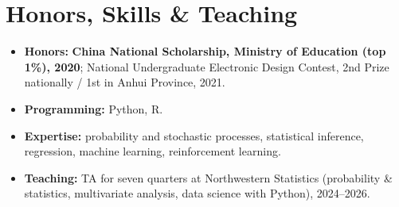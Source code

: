 \documentclass[10.5pt]{article}
\newenvironment{bullets}
  {\begin{itemize}[leftmargin=1.35em, topsep=2.5pt, itemsep=2pt, parsep=0pt,
                   label=\textcolor{accent}{\footnotesize$\bullet$}]\small}
  {\end{itemize}}
\begin{document}
\section{Honors, Skills \& Teaching}
\begin{bullets}
  \item \textbf{Honors:} \textbf{China National Scholarship, Ministry of Education (top 1\%), 2020};
        National Undergraduate Electronic Design Contest, 2nd Prize nationally / 1st in Anhui Province, 2021.
  \item \textbf{Programming:} Python, R.
  \item \textbf{Expertise:} probability and stochastic processes, statistical inference, regression,
        machine learning, reinforcement learning.
  \item \textbf{Teaching:} TA for seven quarters at Northwestern Statistics (probability \& statistics,
        multivariate analysis, data science with Python), 2024--2026.
\end{bullets}
\end{document}
